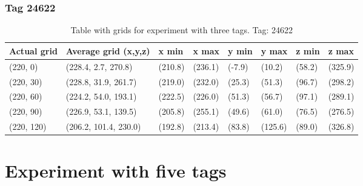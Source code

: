 \subsubsection{Tag 24622}
\begin{table}[H] 
    \begin{tabular}{|l|l|l|l|l|l|l|l|}
        \hline
        Actual grid & Average grid (x,y,z)   & x min   & x max   & y min    & y max   & z min   & z max    \\ \hline
        (220, 0)     & (228.4, 2.7, 270.8)      & (210.8)     & (236.1)    & (-7.9)     & (10.2)      & (58.2)     & (325.9)    \\ \hline
        (220, 30)     & (228.8, 31.9, 261.7)      & (219.0)     & (232.0)    & (25.3)     & (51.3)      & (96.7)     & (298.2)    \\ \hline
        (220, 60)     & (224.2, 54.0, 193.1)      & (222.5)     & (226.0)    & (51.3)     & (56.7)      & (97.1)     & (289.1)    \\ \hline
        (220, 90)     & (226.9, 53.1, 139.5)      & (205.8)     & (255.1)    & (49.6)     & (61.0)      & (76.5)     & (276.5)    \\ \hline
        (220, 120)     & (206.2, 101.4, 230.0)      & (192.8)     & (213.4)    & (83.8)     & (125.6)      & (89.0)     & (326.8)    \\ \hline
    \end{tabular}
    \caption{Table with grids for experiment with three tags. Tag: 24622}
    \label{Tab:three-tag-experiment-result-tag-24622}
\end{table}

\section{Experiment with five tags}

